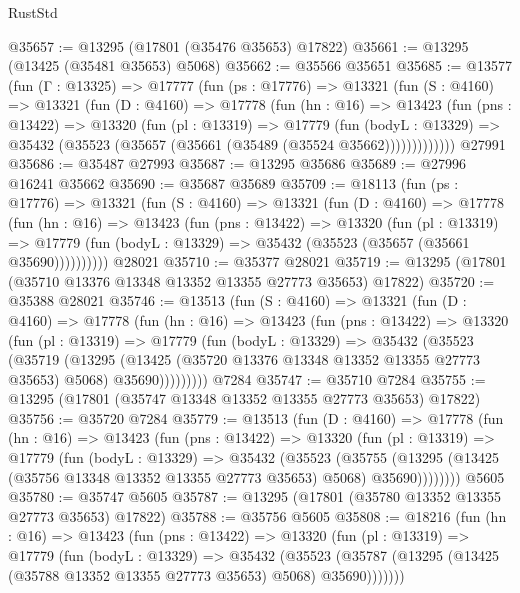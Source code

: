 \begin{lexlean}{RustStd}
\begin{coremodule}
@35657 := @13295 (@17801 (@35476 @35653) @17822)
@35661 := @13295 (@13425 (@35481 @35653) @5068)
@35662 := @35566 @35651
@35685 := @13577
    (fun (Γ : @13325) =>
    @17777
      (fun (ps : @17776) =>
      @13321
        (fun (S : @4160) =>
        @13321
          (fun (D : @4160) =>
          @17778
            (fun (hn : @16) =>
            @13423
              (fun (pns : @13422) =>
              @13320
                (fun (pl : @13319) =>
                @17779
                  (fun (bodyL : @13329) =>
                  @35432 (@35523 (@35657 (@35661 (@35489 (@35524 @35662)))))))))))))
    @27991
@35686 := @35487 @27993
@35687 := @13295 @35686
@35689 := @27996 @16241 @35662
@35690 := @35687 @35689
@35709 := @18113
    (fun (ps : @17776) =>
    @13321
      (fun (S : @4160) =>
      @13321
        (fun (D : @4160) =>
        @17778
          (fun (hn : @16) =>
          @13423
            (fun (pns : @13422) =>
            @13320
              (fun (pl : @13319) =>
              @17779 (fun (bodyL : @13329) => @35432 (@35523 (@35657 (@35661 @35690))))))))))
    @28021
@35710 := @35377 @28021
@35719 := @13295 (@17801 (@35710 @13376 @13348 @13352 @13355 @27773 @35653) @17822)
@35720 := @35388 @28021
@35746 := @13513
    (fun (S : @4160) =>
    @13321
      (fun (D : @4160) =>
      @17778
        (fun (hn : @16) =>
        @13423
          (fun (pns : @13422) =>
          @13320
            (fun (pl : @13319) =>
            @17779
              (fun (bodyL : @13329) =>
              @35432
                (@35523
                  (@35719
                    (@13295
                      (@13425 (@35720 @13376 @13348 @13352 @13355 @27773 @35653) @5068)
                      @35690)))))))))
    @7284
@35747 := @35710 @7284
@35755 := @13295 (@17801 (@35747 @13348 @13352 @13355 @27773 @35653) @17822)
@35756 := @35720 @7284
@35779 := @13513
    (fun (D : @4160) =>
    @17778
      (fun (hn : @16) =>
      @13423
        (fun (pns : @13422) =>
        @13320
          (fun (pl : @13319) =>
          @17779
            (fun (bodyL : @13329) =>
            @35432
              (@35523
                (@35755
                  (@13295 (@13425 (@35756 @13348 @13352 @13355 @27773 @35653) @5068) @35690))))))))
    @5605
@35780 := @35747 @5605
@35787 := @13295 (@17801 (@35780 @13352 @13355 @27773 @35653) @17822)
@35788 := @35756 @5605
@35808 := @18216
    (fun (hn : @16) =>
    @13423
      (fun (pns : @13422) =>
      @13320
        (fun (pl : @13319) =>
        @17779
          (fun (bodyL : @13329) =>
          @35432
            (@35523
              (@35787 (@13295 (@13425 (@35788 @13352 @13355 @27773 @35653) @5068) @35690)))))))

\end{coremodule}
\end{lexlean}
